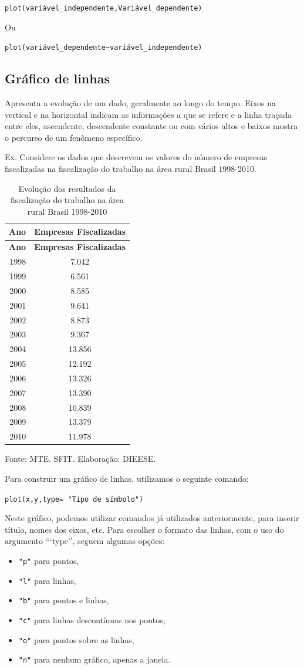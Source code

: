 \documentclass[12pt,brazil,oneside]{book}
\providecommand{\tightlist}{%
  \setlength{\itemsep}{0pt}\setlength{\parskip}{0pt}}
\begin{document}
\texttt{plot(variável\_independente,Variável\_dependente)}

Ou

\texttt{plot(variável\_dependente\textasciitilde{}variável\_independente)}

\hypertarget{grafico-de-linhas}{%
\subsection{Gráfico de linhas}\label{grafico-de-linhas}}

Apresenta a evolução de um dado, geralmente ao longo do tempo. Eixos na
vertical e na horizontal indicam as informações a que se refere e a
linha traçada entre eles, ascendente, descendente constante ou com
vários altos e baixos mostra o percurso de um fenômeno específico.

Ex. Considere os dados que descrevem os valores do número de empresas
fiscalizadas na fiscalização do trabalho na área rural Brasil 1998-2010.

\begin{longtable}[]{@{}rc@{}}
\caption{\label{tab:evolres}Evolução dos resultados da fiscalização do
trabalho na área rural Brasil 1998-2010}\tabularnewline
\toprule
\textbf{Ano} & \textbf{Empresas Fiscalizadas}\tabularnewline
\midrule
\endfirsthead
\toprule
\textbf{Ano} & \textbf{Empresas Fiscalizadas}\tabularnewline
\midrule
\endhead
1998 & 7.042\tabularnewline
1999 & 6.561\tabularnewline
2000 & 8.585\tabularnewline
2001 & 9.641\tabularnewline
2002 & 8.873\tabularnewline
2003 & 9.367\tabularnewline
2004 & 13.856\tabularnewline
2005 & 12.192\tabularnewline
2006 & 13.326\tabularnewline
2007 & 13.390\tabularnewline
2008 & 10.839\tabularnewline
2009 & 13.379\tabularnewline
2010 & 11.978\tabularnewline
\bottomrule
\end{longtable}

Fonte: MTE. SFIT. Elaboração: DIEESE.

Para construir um gráfico de linhas, utilizamos o seguinte comando:

\texttt{plot(x,y,type=\ "Tipo\ de\ símbolo")}

Neste gráfico, podemos utilizar comandos já utilizados anteriormente,
para inserir título, nomes dos eixos, etc. Para escolher o formato das
linhas, com o uso do argumento ```type''\textbar{}, seguem algumas
opções:

\begin{itemize}
\tightlist
\item
  \texttt{"p"} para pontos,
\item
  \texttt{"l"} para linhas,
\item
  \texttt{"b"} para pontos e linhas,
\item
  \texttt{"c"} para linhas descontínuas nos pontos,
\item
  \texttt{"o"} para pontos sobre as linhas,
\item
  \texttt{"n"} para nenhum gráfico, apenas a janela.
\end{itemize}
\end{document}
